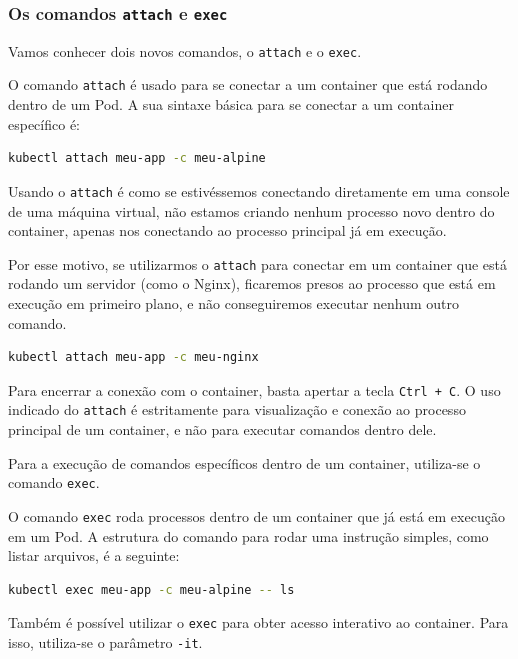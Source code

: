 \documentclass[12pt,a4paper]{article}
\begin{document}
\subsubsection{Os comandos \texttt{attach} e \texttt{exec}}
\label{sec:attach_exec}

Vamos conhecer dois novos comandos, o \texttt{attach} e o \texttt{exec}.

O comando \texttt{attach} é usado para se conectar a um container que está rodando dentro de um Pod. A sua sintaxe básica para se conectar a um container específico é:

\begin{lstlisting}[language=bash]
kubectl attach meu-app -c meu-alpine
\end{lstlisting}

Usando o \texttt{attach} é como se estivéssemos conectando diretamente em uma console de uma máquina virtual, não estamos criando nenhum processo novo dentro do container, apenas nos conectando ao processo principal já em execução.

Por esse motivo, se utilizarmos o \texttt{attach} para conectar em um container que está rodando um servidor (como o Nginx), ficaremos presos ao processo que está em execução em primeiro plano, e não conseguiremos executar nenhum outro comando.

\begin{lstlisting}[language=bash]
kubectl attach meu-app -c meu-nginx
\end{lstlisting}

Para encerrar a conexão com o container, basta apertar a tecla \texttt{Ctrl + C}. O uso indicado do \texttt{attach} é estritamente para visualização e conexão ao processo principal de um container, e não para executar comandos dentro dele.

Para a execução de comandos específicos dentro de um container, utiliza-se o comando \texttt{exec}.

O comando \texttt{exec} roda processos dentro de um container que já está em execução em um Pod. A estrutura do comando para rodar uma instrução simples, como listar arquivos, é a seguinte:

\begin{lstlisting}[language=bash]
kubectl exec meu-app -c meu-alpine -- ls
\end{lstlisting}

Também é possível utilizar o \texttt{exec} para obter acesso interativo ao container. Para isso, utiliza-se o parâmetro \texttt{-it}.
\end{document}
